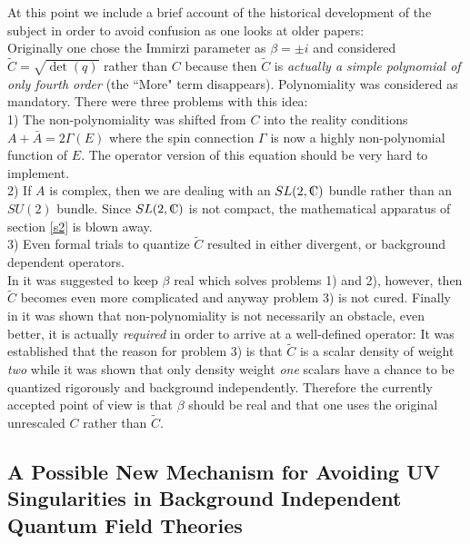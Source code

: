\documentclass[12pt]{report}
\def\Cl{{\mathchoice
{\setbox0=\hbox{$\displaystyle\rm C$}\hbox{\hbox to0pt
{\kern0.4\wd0\vrule height0.9\ht0\hss}\box0}}
{\setbox0=\hbox{$\textstyle\rm C$}\hbox{\hbox to0pt
{\kern0.4\wd0\vrule height0.9\ht0\hss}\box0}}
{\setbox0=\hbox{$\scriptstyle\rm C$}\hbox{\hbox to0pt
{\kern0.4\wd0\vrule height0.9\ht0\hss}\box0}}
{\setbox0=\hbox{$\scriptscriptstyle\rm C$}\hbox{\hbox to0pt
{\kern0.4\wd0\vrule height0.9\ht0\hss}\box0}}}}
\begin{document}
At this point we include a brief account of the historical development
of the subject in order to avoid confusion as one looks at older 
papers: \\
Originally one chose the Immirzi parameter as $\beta=\pm i$ 
and considered $\tilde{C}=\sqrt{\det(q)}$ rather than $C$ because then 
$\tilde{C}$ is {\it actually a simple polynomial of only fourth order}
(the ``More" term disappears).
Polynomiality was considered as mandatory. There were three problems with 
this idea:\\ 
1) The non-polynomiality was shifted from $C$ into the 
reality conditions $A+\bar{A}=2\Gamma(E)$ where the spin connection $\Gamma$
is now a highly non-polynomial function of $E$. The operator version of 
this equation should be very hard to implement.\\
2) If $A$ is complex, then we are dealing with an $SL(2,\Cl)$ bundle rather
than an $SU(2)$ bundle. Since $SL(2,\Cl)$ is not compact, the mathematical
apparatus of section \ref{s2} is blown away.\\
3) Even formal trials to quantize $\tilde{C}$ resulted in either divergent, 
or background dependent operators.\\
In \cite{24} it was suggested to keep $\beta$ real which solves problems
1) and 2), however, then $\tilde{C}$ becomes even more complicated and anyway
problem 3) is not cured. Finally in \cite{41} it was shown that 
non-polynomiality
is not necessarily an obstacle, even better, it is actually {\it required} 
in 
order to arrive at a well-defined operator: It was established that the 
reason for problem 3)
is that $\tilde{C}$ is a scalar density of weight {\it two} while 
it was shown that only density weight {\it one} scalars have a chance to 
be quantized rigorously and background independently. Therefore the currently
accepted point of view is that $\beta$ should be real and that one uses the 
original unrescaled $C$ rather than $\tilde{C}$.

\subsection{A Possible New Mechanism for Avoiding UV Singularities 
in Background Independent Quantum Field Theories}
\label{s3.1.1}
\end{document}
